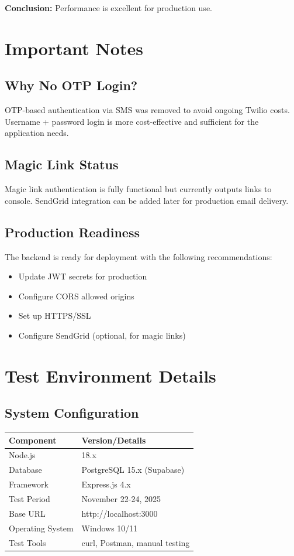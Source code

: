 \documentclass[11pt,a4paper]{article}
\begin{document}
\vspace{0.5cm}
\textbf{Conclusion:} Performance is excellent for production use.

\section{Important Notes}

\subsection{Why No OTP Login?}
OTP-based authentication via SMS was removed to avoid ongoing Twilio costs. Username + password login is more cost-effective and sufficient for the application needs.

\subsection{Magic Link Status}
Magic link authentication is fully functional but currently outputs links to console. SendGrid integration can be added later for production email delivery.

\subsection{Production Readiness}
The backend is ready for deployment with the following recommendations:
\begin{itemize}
    \item Update JWT secrets for production
    \item Configure CORS allowed origins
    \item Set up HTTPS/SSL
    \item Configure SendGrid (optional, for magic links)
\end{itemize}

\section{Test Environment Details}

\subsection{System Configuration}
\begin{tabular}{ll}
\toprule
\textbf{Component} & \textbf{Version/Details} \\
\midrule
Node.js & 18.x \\
Database & PostgreSQL 15.x (Supabase) \\
Framework & Express.js 4.x \\
Test Period & November 22-24, 2025 \\
Base URL & http://localhost:3000 \\
Operating System & Windows 10/11 \\
Test Tools & curl, Postman, manual testing \\
\bottomrule
\end{tabular}
\end{document}
